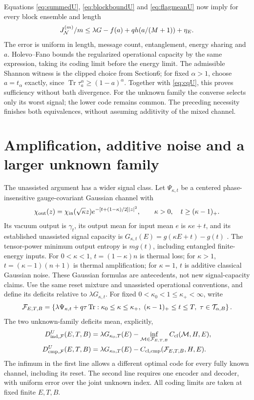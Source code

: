 \documentclass[11pt]{article}
\newcommand{\Tr}{\operatorname{Tr}}
\newcommand{\cmp}{\mathrm{cmp}}
\begin{document}
Equations \eqref{eq:summedU}, \eqref{eq:blockboundU} and
\eqref{eq:flagmeanU} now imply for every block ensemble and length
\[
 J_{\cal N}^{(m)}/m\le
       \lambda G-f(a)+qh(a/(M+1))+\eta_E.
\]
The error is uniform in length, message count, entanglement, energy sharing
and \(a\). Holevo--Fano bounds the regularized operational capacity by
the same expression, taking its coding limit before the energy limit.
The admissible Shannon witness is the clipped choice from Section6;
for fixed \(\alpha>1\), choose \(a=t_\alpha\) exactly, since
\(\Tr\tau_a^\alpha\ge(1-a)^\alpha\).
Together with \eqref{eq:cqU}, this proves sufficiency without bath
divergence. For the unknown family the converse selects only its worst
signal; the lower code remains common. The preceding necessity finishes
both equivalences, without assuming additivity of the mixed channel.

\section{Amplification, additive noise and a larger unknown family}
\label{sec:generalU}
The unassisted argument has a wider signal class. Let \(\Psi_{\kappa,t}\)
be a centered phase-insensitive gauge-covariant Gaussian channel with
\[
 \chi_{\rm out}(z)=\chi_{\rm in}(\sqrt\kappa z)
       e^{-[t+(1-\kappa)/2]|z|^2},\qquad
 \kappa>0,\quad t\ge(\kappa-1)_+ .
\]
Its vacuum output is \(\gamma_t\), its output mean for input mean \(e\)
is \(\kappa e+t\), and its established unassisted signal capacity is
\(G_{\kappa,t}(E)=g(\kappa E+t)-g(t)\)
\cite[Eqs.(24)--(29)]{gaussiancl}\cite[Section7]{optimizer}.
The tensor-power minimum output entropy is \(m g(t)\), including
entangled finite-energy inputs.
For \(0<\kappa<1\), \(t=(1-\kappa)n\) is thermal loss;
for \(\kappa>1\), \(t=(\kappa-1)(n+1)\) is thermal amplification;
for \(\kappa=1\), \(t\) is additive classical Gaussian noise.
These Gaussian formulas are antecedents, not new signal-capacity claims.
Use the same reset mixture and unassisted operational conventions,
and define its deficits relative to \(\lambda G_{\kappa,t}\).
For fixed \(0<\kappa_0<1\le\kappa_+<\infty\), write
\[
 {\cal F}_{E,T,B}=
 \left\{\lambda\Psi_{\kappa,t}+q\tau\Tr:
  \kappa_0\le\kappa\le\kappa_+,\ 
  (\kappa-1)_+\le t\le T,\ \tau\in{\cal T}_{\alpha,B}\right\}.
\]
The two unknown-family deficits mean, explicitly,
\[
\begin{split}
 D^U_{{\rm ind},{\cal F}}(E,T,B)
 &=\lambda G_{\kappa_0,T}(E)
       -\inf_{{\cal M}\in{\cal F}_{E,T,B}}C_{\rm cl}({\cal M},H,E),\\
 D^U_{\cmp,{\cal F}}(E,T,B)
 &=\lambda G_{\kappa_0,T}(E)
       -C_{{\rm cl},\cmp}({\cal F}_{E,T,B},H,E).
\end{split}
\]
The infimum in the first line allows a different optimal code for every
fully known channel, including its reset. The second line requires one
encoder and decoder, with uniform error over the joint unknown index.
All coding limits are taken at fixed finite \(E,T,B\).
\end{document}
